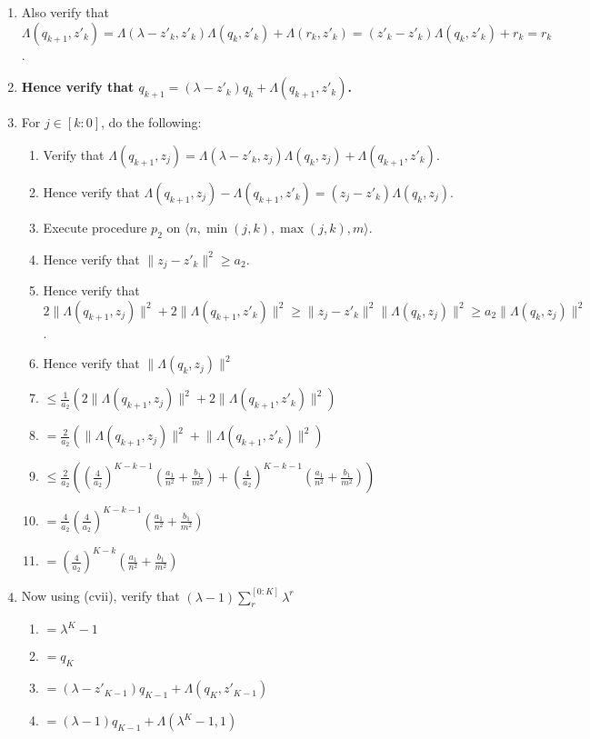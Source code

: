 \documentclass{article}
\newcounter{procedure}[part]
\begin{document}
\begin{multicols}{2}
\begin{enumerate}
\begin{enumerate}
\begin{enumerate}
							\item Also verify that $\Lambda(q_{k+1},z'_k)=\Lambda(\lambda-z'_k,z'_k)\Lambda(q_k,z'_k)+\Lambda(r_k,z'_k)=(z'_k-z'_k)\Lambda(q_k,z'_k)+r_k=r_k$.
							\item \textbf{Hence verify that $q_{k+1}=(\lambda-z'_k)q_k+\Lambda(q_{k+1},z'_k)$.}
							\item For $j\in[k:0]$, do the following:
							\begin{enumerate}
								\item Verify that $\Lambda(q_{k+1},z_j)=\Lambda(\lambda-z'_k,z_j)\Lambda(q_k,z_j)+\Lambda(q_{k+1},z'_k)$.
								\item Hence verify that $\Lambda(q_{k+1},z_j)-\Lambda(q_{k+1},z'_k)=(z_j-z'_k)\Lambda(q_k,z_j)$.
								\item Execute procedure $p_2$ on $\langle n,\min(j,k),\max(j,k),m\rangle$.
								\item Hence verify that $\lVert z_j-z'_k\rVert^2\ge a_2$.
								\item Hence verify that $2\lVert\Lambda(q_{k+1},z_j)\rVert^2+2\lVert\Lambda(q_{k+1},z'_k)\rVert^2\ge\lVert z_j-z'_k\rVert^2\lVert\Lambda(q_k,z_j)\rVert^2\ge a_2\lVert\Lambda(q_k,z_j)\rVert^2$.
								\item Hence verify that $\lVert\Lambda(q_k,z_j)\rVert^2$
								\item $\le\frac{1}{a_2}(2\lVert\Lambda(q_{k+1},z_j)\rVert^2+2\lVert\Lambda(q_{k+1},z'_k)\rVert^2)$
								\item $=\frac{2}{a_2}(\lVert\Lambda(q_{k+1},z_j)\rVert^2+\lVert\Lambda(q_{k+1},z'_k)\rVert^2)$
								\item $\le\frac{2}{a_2}((\frac{4}{a_2})^{K-k-1}(\frac{a_1}{n^2}+\frac{b_1}{m^2})+(\frac{4}{a_2})^{K-k-1}(\frac{a_1}{n^2}+\frac{b_1}{m^2}))$
								\item $=\frac{4}{a_2}(\frac{4}{a_2})^{K-k-1}(\frac{a_1}{n^2}+\frac{b_1}{m^2})$
								\item $=(\frac{4}{a_2})^{K-k}(\frac{a_1}{n^2}+\frac{b_1}{m^2})$
							\end{enumerate}
							\item Now using (cvii), verify that $(\lambda-1)\sum_r^{[0:K]}\lambda^r$
							\begin{enumerate}
								\item $=\lambda^K-1$
								\item $=q_K$
								\item $=(\lambda-z'_{K-1})q_{K-1}+\Lambda(q_K,z'_{K-1})$
								\item $=(\lambda-1)q_{K-1}+\Lambda(\lambda^K-1,1)$

\end{enumerate}
\end{enumerate}
\end{enumerate}
\end{enumerate}
\end{multicols}
\end{document}
